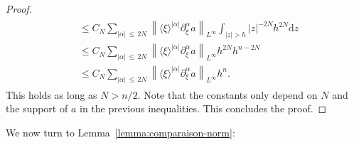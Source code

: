 \documentclass[AHL,Unicode,longabstracts,published]{cedram}
\newcommand{\dd}{\mathrm{d}}
\begin{document}
\begin{proof}
\begin{multline*}
\begin{aligned}
& \leq C_N \sum_{|\alpha|\,\leq\,2N} \left\|\langle \xi \rangle^{|\alpha|} \partial^\alpha_\xi a\right\|_{L^\infty} \int_{|z| > h} |z|^{-2N} h^{2N} \dd z \\
& \leq C_N \sum_{|\alpha|\,\leq\,2N} \left\|\langle \xi \rangle^{|\alpha|} \partial^\alpha_\xi a\right\|_{L^\infty} h^{2N} h^{n-2N} \\
& \leq C_N \sum_{|\alpha|\,\leq\,2N} \left\|\langle \xi \rangle^{|\alpha|} \partial^\alpha_\xi a\right\|_{L^\infty} h^{n}.
\end{aligned}
\end{multline*}
This holds as long as $N > n/2$. Note that the constants only depend on $N$ and the support of $a$ in the previous inequalities. This concludes the proof.
\end{proof}

We now turn to Lemma~\ref{lemma:comparaison-norm}:
\end{document}
